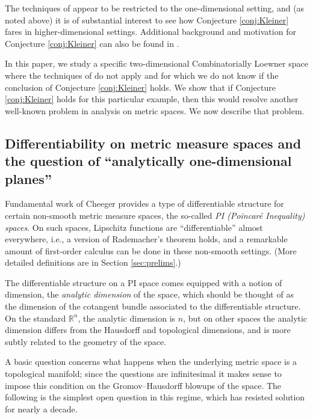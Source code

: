 \documentclass{amsart}
\theoremstyle{plain}
\theoremstyle{definition}
\numberwithin{equation}{section}
\numberwithin{theorem}{section}
\newcommand{\RR}{\mathbb{R}}
\begin{document}
The techniques of \cite{AEBa} appear to be restricted to the one-dimensional setting, and (as noted above) it is of substantial interest to see how Conjecture \ref{conj:Kleiner} fares in higher-dimensional settings.   Additional background and motivation for Conjecture \ref{conj:Kleiner} can also be found in \cite{AEBa}.

In this paper, we study a specific two-dimensional Combinatorially Loewner space where the techniques of \cite{AEBa} do not apply and for which we do not know if the conclusion of Conjecture \ref{conj:Kleiner} holds.  We show that if Conjecture \ref{conj:Kleiner} holds for this particular example, then this would resolve another well-known problem in analysis on metric spaces. We now describe that problem. 

\subsection{Differentiability on metric measure spaces and the question of ``analytically one-dimensional planes''}


Fundamental work of Cheeger \cite{Ch} provides a type of differentiable structure for certain non-smooth metric measure spaces, the so-called \emph{PI (Poincar\'e Inequality) spaces}. On such spaces, Lipschitz functions are ``differentiable'' almost everywhere, i.e., a version of Rademacher's theorem holds, and a remarkable amount of first-order calculus can be done in these non-smooth settings. (More detailed definitions are in Section \ref{sec:prelims}.)

The differentiable structure on a PI space comes equipped with a notion of dimension, the \emph{analytic dimension} of the space, which should be thought of as the dimension of the cotangent bundle associated to the differentiable structure. On the standard $\RR^n$, the analytic dimension is $n$, but on other spaces the analytic dimension differs from the Hausdorff and topological dimensions, and is more subtly related to the geometry of the space.

A basic question concerns what happens when the underlying metric space is a topological manifold; since the questions are infinitesimal it makes sense to impose this condition on the Gromov--Hausdorff blowups of the space. The following is the simplest open question in this regime, which has resisted solution for nearly a decade. 
\end{document}
